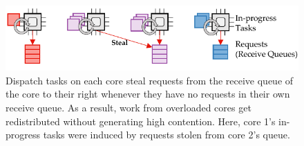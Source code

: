 \begin{figure}[t]
  \includegraphics[width=1.0\columnwidth]{figures/work-stealing.pdf}
  \caption{Dispatch tasks on each core steal requests from the receive queue of
  the core to their right whenever they have no requests in their own
  receive queue. As a result, work from
  overloaded cores get redistributed without generating high contention. Here,
  core 1's in-progress tasks were induced by requests stolen from
  core 2's queue.}
  \label{fig:work-stealing}
\end{figure}
